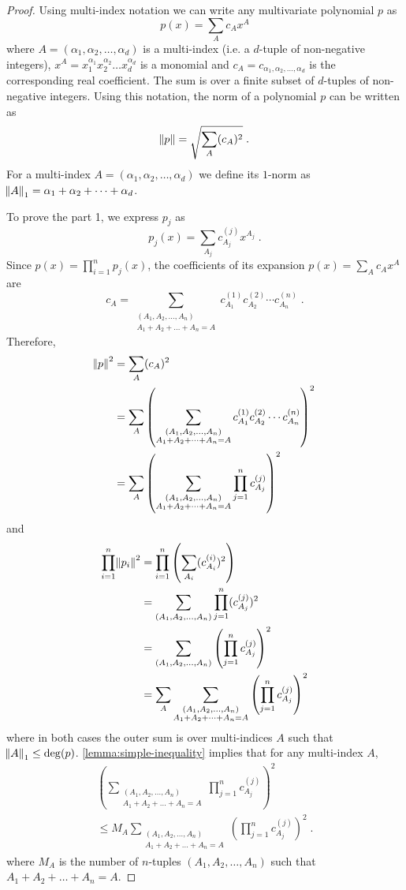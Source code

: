 \begin{proof}
Using multi-index notation we can write any multivariate polynomial $p$ as
$$
p(x) = \sum_A c_A x^A
$$
where $A = (\alpha_1, \alpha_2, \dots, \alpha_d)$ is a multi-index (i.e. a $d$-tuple of
non-negative integers), $x^A = x_1^{\alpha_1} x_2^{\alpha_2} \dots x_d^{\alpha_d}$ is a
monomial and $c_A = c_{\alpha_1, \alpha_2, \dots, \alpha_d}$ is the corresponding real
coefficient. The sum is over a finite subset of $d$-tuples of non-negative
integers. Using this notation, the norm of a polynomial $p$ can be written as
$$
\norm{p} = \sqrt{\sum_A (c_A)^2} \; .
$$
For a multi-index $A = (\alpha_1, \alpha_2, \dots, \alpha_d)$ we define its
$1$-norm as $\norm{A}_1 = \alpha_1 + \alpha_2 + \dots + \alpha_d$.

To prove the part 1, we express $p_j$ as
$$
p_j(x) = \sum_{A_j} c^{(j)}_{A_j} x^{A_j} \; .
$$
Since $p(x) = \prod_{i=1}^n p_j(x)$, the coefficients of its expansion $p(x) =
\sum_A c_A x^A$ are
$$
c_A = \sum_{\substack{(A_1, A_2, \dots, A_n) \\ A_1 + A_2 + \dots + A_n = A}} c^{(1)}_{A_1} c^{(2)}_{A_2} \cdots c^{(n)}_{A_n} \; .
$$
Therefore,
\begin{align*}
\norm{p}^2
& = \sum_{A} (c_A)^2 \\
& = \sum_{A} \left( \sum_{\substack{(A_1, A_2, \dots, A_n) \\ A_1 + A_2 + \dots + A_n = A}} c^{(1)}_{A_1} c^{(2)}_{A_2} \cdots c^{(n)}_{A_n} \right)^2 \\
& = \sum_{A} \left( \sum_{\substack{(A_1, A_2, \dots, A_n) \\ A_1 + A_2 + \dots + A_n = A}} \prod_{j=1}^n c^{(j)}_{A_j} \right)^2
\end{align*}
and
\begin{align*}
\prod_{i=1}^n \norm{p_i}^2
& = \prod_{i=1}^n \left( \sum_{A_i} (c^{(i)}_{A_i})^2 \right) \\
& = \sum_{(A_1, A_2, \dots, A_n)} \prod_{j=1}^n (c^{(j)}_{A_j})^2 \\
& = \sum_{(A_1, A_2, \dots, A_n)} \left( \prod_{j=1}^n c^{(j)}_{A_j} \right)^2 \\
& = \sum_A \sum_{\substack{(A_1, A_2, \dots, A_n) \\ A_1 + A_2 + \dots + A_n = A}} \left( \prod_{j=1}^n c^{(j)}_{A_j} \right)^2
\end{align*}
where in both cases the outer sum is over multi-indices $A$ such that $\norm{A}_1 \le \deg(p)$.
\autoref{lemma:simple-inequality} implies that for any multi-index $A$,
\begin{multline*}
\left( \sum_{\substack{(A_1, A_2, \dots, A_n) \\ A_1 + A_2 + \dots + A_n = A}} \prod_{j=1}^n c^{(j)}_{A_j} \right)^2 \\
\le M_A \sum_{\substack{(A_1, A_2, \dots, A_n) \\ A_1 + A_2 + \dots + A_n = A}} \left( \prod_{j=1}^n c^{(j)}_{A_j} \right)^2 \; .
\end{multline*}
where $M_A$ is the number of $n$-tuples $(A_1, A_2, \dots, A_n)$ such that $A_1 +
A_2 + \dots + A_n = A$.


\end{proof}
